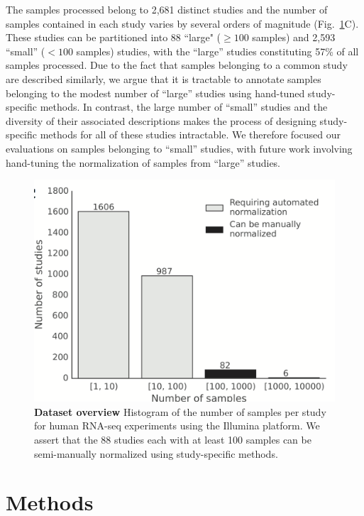 The samples processed belong to 2,681 distinct studies and the number of samples contained in each study varies by several orders of magnitude (Fig.~\ref{fig:dataset}C).  These studies can be partitioned into 88 ``large" ($\geq 100$ samples) and 2,593 ``small'' ($< 100$ samples) studies, with the ``large'' studies constituting 57\% of all samples processed.  Due to the fact that samples belonging to a common study are described similarly, we argue that it is tractable to annotate samples belonging to the modest number of ``large'' studies using hand-tuned study-specific methods.  In contrast, the large number of ``small'' studies and the diversity of their associated descriptions makes the process of designing study-specific methods for all of these studies intractable.  We therefore focused our evaluations on samples belonging to ``small'' studies, with future work involving hand-tuning the normalization of samples from ``large'' studies.

\begin{figure}[!tpb]
\centerline{\includegraphics[scale=0.20]{figures/data_set_figure.png}}
\caption{\textbf{Dataset overview} Histogram of the number of samples per study for human RNA-seq experiments using the Illumina platform. We assert that the 88 studies each with at least 100 samples can be semi-manually normalized using study-specific methods.}
\label{fig:dataset}
\end{figure}





\section{Methods}

